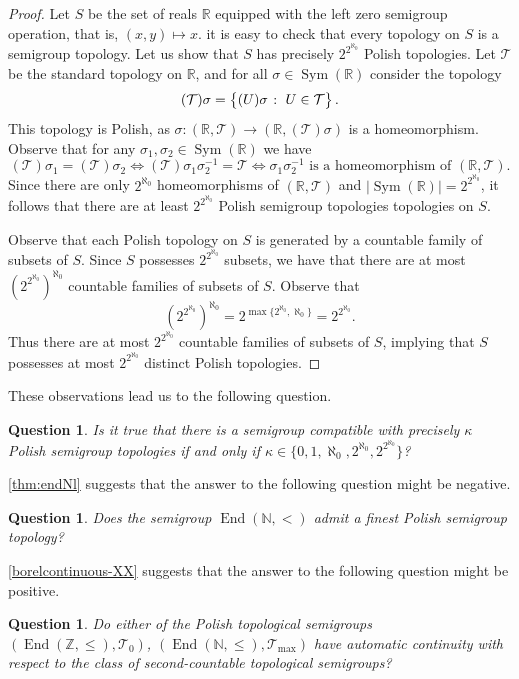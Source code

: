 \documentclass[11pt]{amsart}
\makeatletter
\newtheorem{question}[theorem]{Question}
\theoremstyle{definition}
\newcommand{\N}{\mathbb N}
\newcommand{\Tau}{\mathcal T}
\newcommand{\Zendd}{\operatorname{End}(\mathbb Z, \leq)}
\newcommand{\Sym}{\operatorname{Sym}}
\newcommand{\makeset}[2]{\left\lbrace #1 \; \colon\;
 \begin{tabular}{@{}l@{}}
   #2
  \end{tabular}
  \right\rbrace}
\makeatother
\begin{document}
\begin{proof}
Let $S$ be the set of reals $\mathbb R$ equipped with the left zero semigroup operation, that is, \((x,y)\mapsto x\). it is easy to check that every topology on $S$ is a semigroup topology.  Let us show that $S$ has precisely $2^{2^{\aleph_0}}$ Polish topologies. 
Let \(\Tau\) be the standard topology on \(\mathbb{R}\), and for all \(\sigma\in \Sym(\mathbb R)\) consider the topology
\[(\Tau)\sigma =\makeset{(U)\sigma}{\(U\in \Tau\)}.\]
This topology is Polish, as \(\sigma: (\mathbb R,\Tau)\rightarrow (\mathbb R,(\Tau)\sigma)\) is a homeomorphism.
Observe that for any $\sigma_1,\sigma_2\in\Sym(\mathbb R)$ we have
\[(\Tau)\sigma_1 =(\Tau)\sigma_2 \iff (\Tau)\sigma_1\sigma_2^{-1} =\Tau \iff \sigma_1\sigma_2^{-1} \text{ is a homeomorphism of }(\mathbb R,\Tau).\]
Since there are only $2^{\aleph_0}$ homeomorphisms of $(\mathbb R,\Tau)$ and $|\Sym(\mathbb R)|=2^{2^{\aleph_0}}$, it follows that there are at least \(2^{2^{\aleph_0}}\) Polish semigroup topologies topologies on $S$.

Observe that each Polish topology on $S$ is generated by a countable family of subsets of $S$. Since $S$ possesses $2^{2^{\aleph_0}}$ subsets, we have that there are at most $(2^{2^{\aleph_0}})^{\aleph_0}$ countable families of subsets of $S$. Observe that $$(2^{2^{\aleph_0}})^{\aleph_0}=2^{\max\{2^{\aleph_0}, \aleph_0\}}=2^{2^{\aleph_0}}.$$ Thus there are at most $2^{2^{\aleph_0}}$ countable families of subsets of $S$, implying that $S$ possesses at most \(2^{2^{\aleph_0}}\) distinct Polish topologies. 
\end{proof}
These observations lead us to the following question.
\begin{question}
Is it true that there is a semigroup compatible with precisely \(\kappa\) Polish semigroup topologies if and only if \(\kappa\in \{0, 1,\aleph_0,2^{\aleph_0},2^{2^{\aleph_0}}\}\)?
\end{question}

\cref{thm:endNl} suggests that the answer to the following question might be negative.

\begin{question}
    Does the semigroup $\operatorname{End}(\N,<)$ admit a finest Polish semigroup topology?
\end{question}

\cref{borelcontinuous-XX} suggests that the answer to the following question might be positive.

\begin{question}
    Do either of the Polish topological semigroups \((\Zendd,\Tau_0)\),  \((\operatorname{End}(\N,\leq),\Tau_{\max})\) have automatic continuity with respect to the class of second-countable topological semigroups? 
\end{question}
\end{document}

